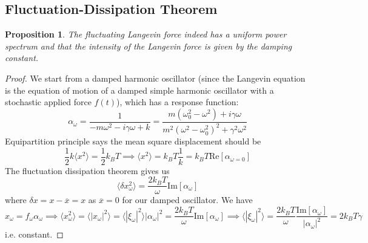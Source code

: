 \documentclass[a4paper]{article}
\theoremstyle{new}
\newtheorem{prop}{Proposition}[section]
\begin{document}
\subsection{Fluctuation-Dissipation Theorem}









\begin{prop}
The fluctuating Langevin force indeed has a uniform power spectrum and that the intensity of the Langevin force is given by the damping constant.
\end{prop}
\begin{proof}
We start from a damped harmonic oscillator (since the Langevin equation is the equation of motion of a damped simple harmonic oscillator with a stochastic applied force $f(t)$), which has a response function:
$$\alpha_\omega=\frac{1}{-m\omega^2-i\gamma\omega+k}=\frac{m(\omega_0^2-\omega^2)+i\gamma\omega}{m^2(\omega^2-\omega_0^2)^2+\gamma^2\omega^2}$$
Equipartition principle says the mean square displacement should be
$$\frac{1}{2}k\langle x^2\rangle=\frac{1}{2}k_BT\implies\langle x^2\rangle=k_BT\frac{1}{k}=k_BT\text{Re}[\alpha_{\omega=0}]$$
The fluctuation dissipation theorem gives us
$$\langle\delta x_\omega^2\rangle=\frac{2k_BT}{\omega}\text{Im}[\alpha_\omega]$$
where $\delta x=x-\overline{x}=x$ as $\overline{x}=0$ for our damped oscillator. We have
$$x_\omega=f_\omega\alpha_\omega\implies\langle x^2_\omega\rangle=\langle|x_\omega|^2\rangle=\langle|\xi_\omega|^2\rangle|\alpha_\omega|^2=\frac{2k_BT}{\omega}\text{Im}[\alpha_\omega]\implies\langle|\xi_\omega|^2\rangle=\frac{2k_BT}{\omega}\frac{\text{Im}[\alpha_\omega]}{|\alpha_\omega|^2}=2k_BT\gamma$$
i.e. constant.
\end{proof}


\end{document}
